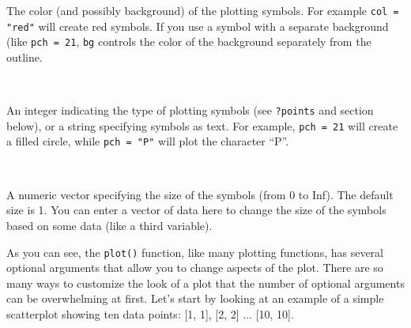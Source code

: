 \documentclass{tufte-book}\usepackage[]{graphicx}\usepackage[]{color}
\begin{document}
{{\begin{description}
          \begin{footnotesize}
    The color (and possibly background) of the plotting symbols. For example \texttt{col = "red"} will create red symbols. If you use a symbol with a separate background (like \texttt{pch = 21}, \texttt{bg} controls the color of the background separately from the outline.
       \end{footnotesize}

\item[\tt{pch}] \hfill \\
      \begin{footnotesize}
    An integer indicating the type of plotting symbols (see \texttt{?points} and section below), or a string specifying symbols as text. For example, \texttt{pch = 21} will create a filled circle, while \texttt{pch = "P"} will plot the character ``P''.
      \end{footnotesize}

\item[\tt{cex}] \hfill \\
          \begin{footnotesize}
  A numeric vector specifying the size of the symbols (from 0 to Inf). The default size is 1. You can enter a vector of data here to change the size of the symbols based on some data (like a third variable).
        \end{footnotesize}



\end{description}

}
}
\vspace{5mm} %

As you can see, the \texttt{plot()} function, like many plotting functions, has several optional arguments that allow you to change aspects of the plot. There are so many ways to customize the look of a plot that the number of optional arguments can be overwhelming at first. Let's start by looking at an example of a simple scatterplot showing ten data points: [1, 1], [2, 2] ... [10, 10].
\end{document}
